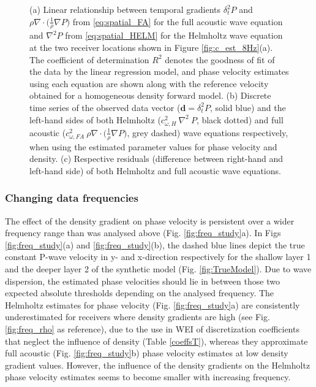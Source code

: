\documentclass[]{article}
\begin{document}
\begin{figure}[H]
	\caption{(a) Linear relationship between temporal gradients $\delta_{t}^{2}P$ and $\rho \nabla \cdot \big(\frac{1}{\rho} \nabla P\big)$ from \eqref{eq:spatial_FA} for the full acoustic wave equation and $\nabla^{2} P$ from \eqref{eq:spatial_HELM} for the Helmholtz wave equation at the two receiver locations shown in Figure \ref{fig:c_est_8Hz}(a). The coefficient of determination $R^{2}$ denotes the goodness of fit of the data by the linear regression model, and phase velocity estimates using each equation are shown along with the reference velocity obtained for a homogeneous density forward model. (b) Discrete time series of the observed data vector ($\bm{d} = \delta_{t}^{2}P$, solid blue) and the left-hand sides of both Helmholtz ($c_{\omega,H}^{2} \: \nabla^{2} \:P$, black dotted) and full acoustic ($c_{\omega,FA}^{2} \:  \rho \nabla \cdot \big(\frac{1}{\rho} \nabla P\big)$, grey dashed) wave equations respectively, when using the estimated parameter values for phase velocity and density. (c) Respective residuals (difference between right-hand and left-hand side) of both Helmholtz and full acoustic wave equations.}\label{fig:misfit}
	\end{figure} %
	
	
	\subsubsection*{Changing data frequencies} \label{sec:freqs}
	
	The effect of the density gradient on phase velocity is persistent over a wider frequency range than was analysed above (Fig. \ref{fig:freq_study}a). In Figs \ref{fig:freq_study}(a) and \ref{fig:freq_study}(b), the dashed blue lines depict the true constant P-wave velocity in y- and x-direction respectively for the shallow layer 1 and the deeper layer 2 of the synthetic model (Fig. \ref{fig:TrueModel}). Due to wave dispersion, the estimated phase velocities should lie in between those two expected absolute thresholds depending on the analysed frequency. The Helmholtz estimates for phase velocity (Fig. \ref{fig:freq_study}a) are consistently underestimated for receivers where density gradients are high (see Fig. \ref{fig:freq_rho} as reference), due to the use in WEI of discretization coefficients that neglect the influence of density (Table \ref{coeffsT}),  whereas they approximate full acoustic (Fig. \ref{fig:freq_study}b) phase velocity estimates at low density gradient values. However, the influence of the density gradients on the Helmholtz phase velocity estimates seems to become smaller with increasing frequency.
	
\end{document}
